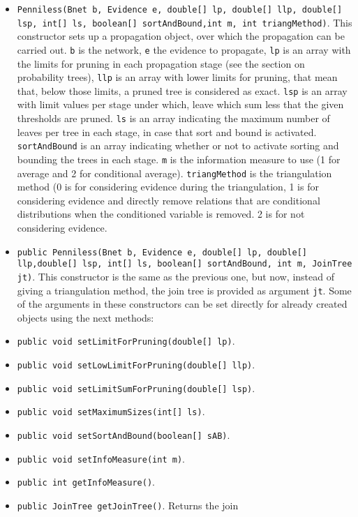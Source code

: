 \begin{itemize}
\item \texttt{Penniless(Bnet b, Evidence e, double[] lp, double[] llp,
    double[] lsp, int[] ls, boolean[] sortAndBound,int m, int triangMethod)}.
  This constructor sets up a propagation object, over which
  the propagation can be carried out.
  \texttt{b} is the network, \texttt{e} the evidence to propagate,
  \texttt{lp} is an array with the limits for pruning in each
  propagation stage (see the section on probability trees),
  \texttt{llp} is an array with
  lower limits for pruning, that mean that, below those
  limits, a pruned tree is considered as exact. \texttt{lsp} is an
  array with limit values per stage under which, leave which
  sum less that the given thresholds are pruned. \texttt{ls} is an
  array indicating the maximum number of leaves per tree in
  each stage, in case that sort and bound is activated.
  \texttt{sortAndBound} is an array indicating whether or not to
  activate sorting and bounding the trees in each stage. \texttt{m} is
  the information measure to use (1 for average and 2 for
  conditional average). \texttt{triangMethod} is the triangulation
  method (0 is for considering evidence during the
  triangulation, 1 is for considering evidence and directly remove relations
  that are conditional distributions when the conditioned variable is removed.
  2 is for not considering evidence.
\item \texttt{public Penniless(Bnet b, Evidence e, double[] lp,
    double[] llp,double[] lsp, int[] ls, boolean[] sortAndBound,
    int m, JoinTree jt)}.
  This constructor is the same as the previous one, but
  now, instead of giving a triangulation method, the join
  tree is provided as argument \texttt{jt}. Some of the
  arguments in these constructors can be set directly for
  already created objects using the next methods:
\item \texttt{public void setLimitForPruning(double[] lp)}.
\item \texttt{public void setLowLimitForPruning(double[] llp)}.
\item \texttt{public void setLimitSumForPruning(double[] lsp)}.
\item \texttt{public void setMaximumSizes(int[] ls)}.
\item \texttt{public void setSortAndBound(boolean[] sAB)}.
\item \texttt{public void setInfoMeasure(int m)}.
\item \texttt{public int getInfoMeasure()}.
\item \texttt{public JoinTree getJoinTree()}. Returns the join

\end{itemize}
